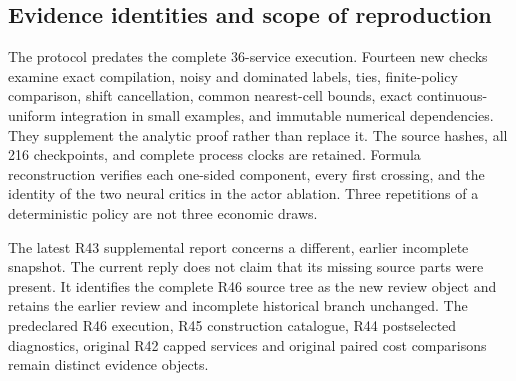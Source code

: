 \subsection{Evidence identities and scope of reproduction}
The protocol predates the complete 36-service execution. Fourteen new checks examine exact compilation, noisy and dominated labels, ties, finite-policy comparison, shift cancellation, common nearest-cell bounds, exact continuous-uniform integration in small examples, and immutable numerical dependencies. They supplement the analytic proof rather than replace it. The source hashes, all 216 checkpoints, and complete process clocks are retained. Formula reconstruction verifies each one-sided component, every first crossing, and the identity of the two neural critics in the actor ablation. Three repetitions of a deterministic policy are not three economic draws.

The latest R43 supplemental report concerns a different, earlier incomplete snapshot. The current reply does not claim that its missing source parts were present. It identifies the complete R46 source tree as the new review object and retains the earlier review and incomplete historical branch unchanged. The predeclared R46 execution, R45 construction catalogue, R44 postselected diagnostics, original R42 capped services and original paired cost comparisons remain distinct evidence objects.



